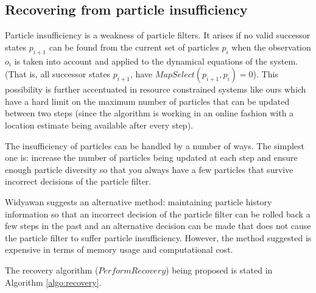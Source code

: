 \subsection{Recovering from particle insufficiency}

Particle insufficiency is a weakness of particle filters. It arises if 
no valid successor states $p_{i+1}$ can be found from the current set of 
particles $p_i$ when the observation $o_i$ is taken into account and applied 
to the dynamical equations of the system. (That is, all successor states 
$p_{i+1}$, have $MapSelect(p_{i+1}, p_i) = 0$). This possibility is 
further accentuated in resource constrained systems like ours which 
have a hard limit on the maximum number of particles that can be 
updated between two steps (since the algorithm is working in an online
fashion with a location estimate being available after every step).

The insufficiency of particles can be handled by a number of ways. 
The simplest one is: increase the number of particles being updated at each 
step and ensure enough particle diversity so that you always have 
a few particles that survive incorrect decisions of the particle filter. 

Widyawan \cite{Widyawan} suggests an alternative method: maintaining particle
history information so that an incorrect decision of the particle filter can be
rolled back a few steps in the past and an alternative decision can be made that
does not cause the particle filter to suffer particle insufficiency. However,
the method suggested is expensive in terms of memory usage and computational
cost.

The recovery algorithm ($PerformRecovery$) being proposed is stated in 
Algorithm \ref{algo:recovery}.

